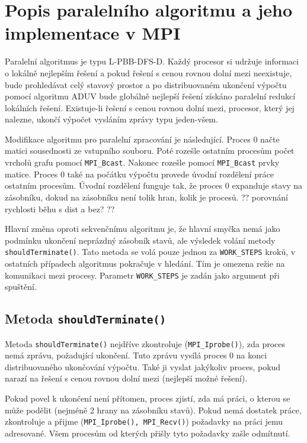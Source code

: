 \documentclass[12pt]{article}
\begin{document}
\section{Popis paralelního algoritmu a jeho implementace v MPI}

Paralelní algoritmus je typu L-PBB-DFS-D. Každý procesor si udržuje informaci o lokálně nejlepším řešení a pokud řešení s cenou rovnou dolní mezi neexistuje, bude prohledávat celý stavový prostor a po distribuovaném ukončení výpočtu pomocí algoritmu ADUV bude globálně nejlepší řešení získáno paralelní redukcí lokálních řešení. Existuje-li řešení s cenou rovnou dolní mezi, procesor, který jej nalezne, ukončí výpočet vysláním zprávy typu jeden-všem.

Modifikace algoritmu pro paralelní zpracování je následující. Proces 0 načte matici sousednosti ze vstupního souboru. Poté rozešle ostatním procesům počet vrcholů grafu pomocí \texttt{MPI\_Bcast}. Nakonec rozešle pomocí \texttt{MPI\_Bcast} prvky matice. Proces 0 také na počátku výpočtu provede úvodní rozdělení práce ostatním procesům. Úvodní rozdělení funguje tak, že proces 0 expanduje stavy na zásobníku, dokud na zásobníku není tolik hran, kolik je procesů. ?? porovnání rychlosti běhu s dist a bez? ??

Hlavní změna oproti sekvenčnímu algoritmu je, že hlavní smyčka nemá jako podmínku ukončení neprázdný zásobník stavů, ale výsledek volání metody \texttt{shouldTerminate()}. Tato metoda se volá pouze jednou za \texttt{WORK\_STEPS} kroků, v ostatních případech algoritmus pokračuje v hledání. Tím je omezena režie na komunikaci mezi procesy. Parametr \texttt{WORK\_STEPS} je zadán jako argument při spuštění.

\subsection{Metoda \texttt{shouldTerminate()}}

Metoda \texttt{shouldTerminate()} nejdříve zkontroluje (\texttt{MPI\_Iprobe()}), zda proces nemá zprávu, požadující ukončení. Tuto zprávu vysílá proces 0 na konci distribuovaného ukončování výpočtu. Také ji vyslat jakýkoliv proces, pokud narazí na řešení s cenou rovnou dolní mezi (nejlepší možné řešení). 

Pokud povel k ukončení není přítomen, proces zjistí, zda má práci, o kterou se může podělit (nejméně 2 hrany na zásobníku stavů). Pokud nemá dostatek práce, zkontroluje a přijme (\texttt{MPI\_Iprobe(), MPI\_Recv()}) požadavky na práci jemu adresované. Všem procesům od kterých přišly tyto požadavky zašle odmítnutí.
\end{document}

